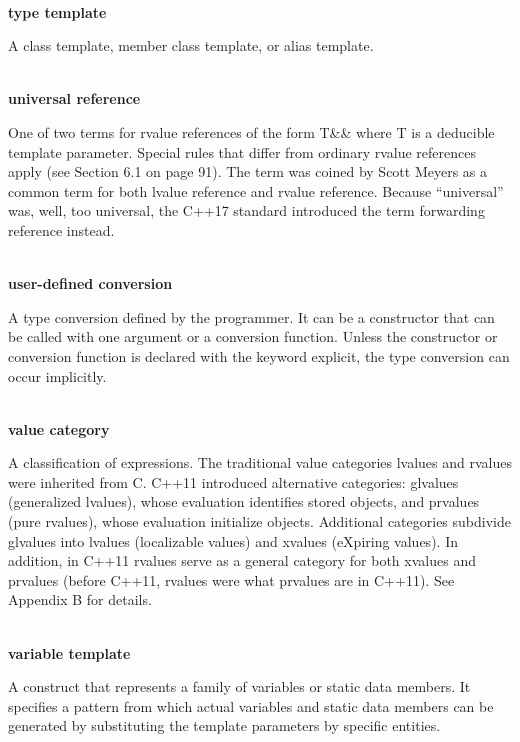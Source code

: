 \hspace*{\fill} \\ %
\noindent
\textbf{type template}

A class template, member class template, or alias template.

\hspace*{\fill} \\ %
\noindent
\textbf{universal reference}

One of two terms for rvalue references of the form T\&\& where T is a deducible template parameter. Special rules that differ from ordinary rvalue references apply (see Section 6.1 on page 91). The term was coined by Scott Meyers as a common term for both lvalue reference and rvalue reference. Because “universal” was, well, too universal, the C++17 standard introduced the term forwarding reference instead.

\hspace*{\fill} \\ %
\noindent
\textbf{user-defined conversion}

A type conversion defined by the programmer. It can be a constructor that can be called with one argument or a conversion function. Unless the constructor or conversion function is declared with the keyword explicit, the type conversion can occur implicitly.

\hspace*{\fill} \\ %
\noindent
\textbf{value category}

A classification of expressions. The traditional value categories lvalues and rvalues were inherited from C. C++11 introduced alternative categories: glvalues (generalized lvalues), whose evaluation identifies stored objects, and prvalues (pure rvalues), whose evaluation initialize objects. Additional categories subdivide glvalues into lvalues (localizable values) and xvalues (eXpiring values). In addition, in C++11 rvalues serve as a general category for both xvalues and prvalues (before C++11, rvalues were what prvalues are in C++11). See Appendix B for details.

\hspace*{\fill} \\ %
\noindent
\textbf{variable template}

A construct that represents a family of variables or static data members. It specifies a pattern from which actual variables and static data members can be generated by substituting the template parameters by specific entities.

